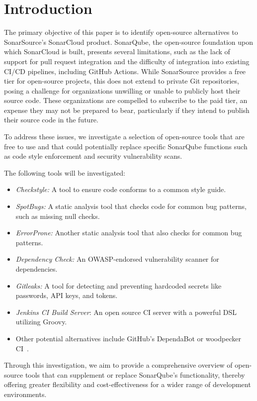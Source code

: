 \section{Introduction}\label{sec:introduction}

The primary objective of this paper is to identify open-source alternatives to SonarSource's SonarCloud product.
SonarQube, the open-source foundation upon which SonarCloud is built, presents several limitations, such as the lack of support for pull request integration and the difficulty of integration into existing CI/CD pipelines, including GitHub Actions.
While SonarSource provides a free tier for open-source projects, this does not extend to private Git repositories, posing a challenge for organizations unwilling or unable to publicly host their source code.
These organizations are compelled to subscribe to the paid tier, an expense they may not be prepared to bear, particularly if they intend to publish their source code in the future.

To address these issues, we investigate a selection of open-source tools that are free to use and that could potentially replace specific SonarQube functions such as code style enforcement and security vulnerability scans.

The following tools will be investigated:
\begin{itemize}
    \item \textit{Checkstyle:} A tool to ensure code conforms to a common style guide.
    \item \textit{SpotBugs:} A static analysis tool that checks code for common bug patterns, such as missing null checks.
    \item \textit{ErrorProne:} Another static analysis tool that also checks for common bug patterns.
    \item \textit{Dependency Check:} An OWASP-endorsed vulnerability scanner for dependencies.
    \item \textit{Gitleaks:} A tool for detecting and preventing hardcoded secrets like passwords, API keys, and tokens.
    \item \textit{Jenkins CI Build Server}: An open source CI server with a powerful DSL utilizing Groovy.
    \item Other potential alternatives include GitHub's DependaBot or woodpecker CI\ .
\end{itemize}

Through this investigation, we aim to provide a comprehensive overview of open-source tools that can supplement or replace SonarQube's functionality, thereby offering greater flexibility and cost-effectiveness for a wider range of development environments.